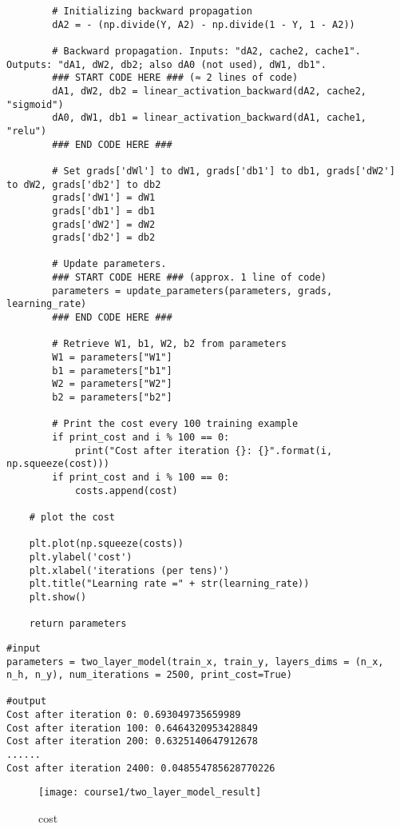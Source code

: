 \begin{verbatim}
        # Initializing backward propagation
        dA2 = - (np.divide(Y, A2) - np.divide(1 - Y, 1 - A2))
        
        # Backward propagation. Inputs: "dA2, cache2, cache1". Outputs: "dA1, dW2, db2; also dA0 (not used), dW1, db1".
        ### START CODE HERE ### (≈ 2 lines of code)
        dA1, dW2, db2 = linear_activation_backward(dA2, cache2, "sigmoid")
        dA0, dW1, db1 = linear_activation_backward(dA1, cache1, "relu")
        ### END CODE HERE ###
        
        # Set grads['dWl'] to dW1, grads['db1'] to db1, grads['dW2'] to dW2, grads['db2'] to db2
        grads['dW1'] = dW1
        grads['db1'] = db1
        grads['dW2'] = dW2
        grads['db2'] = db2
        
        # Update parameters.
        ### START CODE HERE ### (approx. 1 line of code)
        parameters = update_parameters(parameters, grads, learning_rate)
        ### END CODE HERE ###

        # Retrieve W1, b1, W2, b2 from parameters
        W1 = parameters["W1"]
        b1 = parameters["b1"]
        W2 = parameters["W2"]
        b2 = parameters["b2"]
        
        # Print the cost every 100 training example
        if print_cost and i % 100 == 0:
            print("Cost after iteration {}: {}".format(i, np.squeeze(cost)))
        if print_cost and i % 100 == 0:
            costs.append(cost)
       
    # plot the cost

    plt.plot(np.squeeze(costs))
    plt.ylabel('cost')
    plt.xlabel('iterations (per tens)')
    plt.title("Learning rate =" + str(learning_rate))
    plt.show()
    
    return parameters
\end{verbatim}

\begin{verbatim}
#input
parameters = two_layer_model(train_x, train_y, layers_dims = (n_x, n_h, n_y), num_iterations = 2500, print_cost=True)

#output
Cost after iteration 0: 0.693049735659989
Cost after iteration 100: 0.6464320953428849
Cost after iteration 200: 0.6325140647912678
......
Cost after iteration 2400: 0.048554785628770226
\end{verbatim}
\begin{figure}[h]
\begin{center}
\texttt{[image: course1/two\_layer\_model\_result]}
\caption{cost}
\label{two_layer_model_result}
\end{center}
\end{figure}


